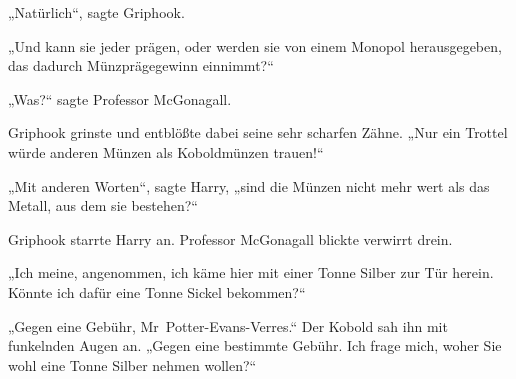 „Natürlich“, sagte Griphook.

„Und kann sie jeder prägen, oder werden sie von einem Monopol herausgegeben, das dadurch Münzprägegewinn einnimmt?“

„Was?“ sagte Professor McGonagall.

Griphook grinste und entblößte dabei seine sehr scharfen Zähne.
„Nur ein Trottel würde anderen Münzen als Koboldmünzen trauen!“

„Mit anderen Worten“, sagte Harry, „sind die Münzen nicht mehr wert als das Metall, aus dem sie bestehen?“

Griphook starrte Harry an. Professor McGonagall blickte verwirrt drein.

„Ich meine, angenommen, ich käme hier mit einer Tonne Silber zur Tür herein. Könnte ich dafür eine Tonne Sickel bekommen?“

„Gegen eine Gebühr, Mr~Potter-Evans-Verres.“ Der Kobold sah ihn mit funkelnden Augen an.
„Gegen eine bestimmte Gebühr. Ich frage mich, woher Sie wohl eine Tonne Silber nehmen wollen?“

